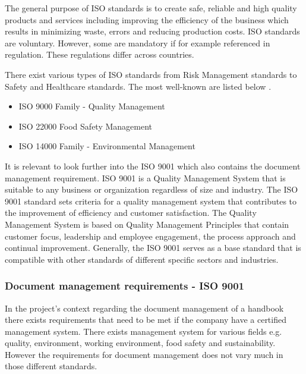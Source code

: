 The general purpose of ISO standards is to create safe, reliable and high quality products and services including improving the efficiency of the business which results in minimizing waste, errors and reducing production costs\cite{ISOinfo}. %
ISO standards are voluntary. However, some are mandatory if for example referenced in regulation. These regulations differ across countries\cite{ISOreviewedevery5years}. 

There exist various types of ISO standards from Risk Management standards to Safety and Healthcare standards. The most well-known are listed below \citep{ISOmostpopularlist}.

\begin{itemize}
	\item ISO 9000 Family - Quality Management
	\item ISO 22000 Food Safety Management
	\item ISO 14000 Family - Environmental Management
\end{itemize}

It is relevant to look further into the ISO 9001 which also contains the document management requirement. ISO 9001 is a Quality Management System that is suitable to any business or organization regardless of size and industry\cite{ISO9001}. The ISO 9001 standard sets criteria for a quality management system that contributes to the improvement of efficiency and customer satisfaction. The Quality Management System is based on Quality Management Principles that contain customer focus, leadership and employee engagement, the process approach and continual improvement\cite{ISO9001-2}. Generally, the ISO 9001 serves as a base standard that is compatible with other standards of different specific sectors and industries.

\subsubsection{Document management requirements - ISO 9001}
In the project's context regarding the document management of a handbook there exists requirements that need to be met if the company have a certified management system. There exists management system for various fields e.g. quality, environment, working environment, food safety and sustainability.  However the requirements for document management does not vary much in those different standards. 

